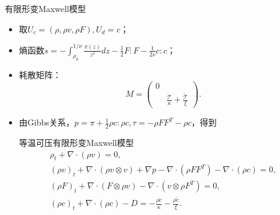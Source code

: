 \documentclass[mathserif]{beamer}
\begin{document}
\begin{frame}{有限形变Maxwell模型}
	\begin{itemize}
		\item<2-> 取$U_c=(\rho, \rho v ,\rho F),U_d = c$；
		\item<3-> 熵函数$ s = -\int_{\rho_0}^{1/\nu} \frac{\pi(z)}{z^2} dz - \frac{1}{2}F:F  - \frac{1}{2\nu }c:c $；
		\item<4-> 耗散矩阵：\begin{equation*}
	M = \left( \begin{matrix}
		0 & \\  & \frac{\dot{\mathcal{T}}}{\kappa} + \frac{\mathring{\mathcal{T}}}{\xi}
	\end{matrix} \right).
	\end{equation*}
	\item<5-> 由Gibbs关系，$p = \pi + \frac{1}{2} \rho c:\rho c,\tau=-\rho FF^T - \rho c$，得到
	\begin{block}{等温可压有限形变Maxwell模型}
	\begin{subequations}%
  \begin{align*}
  \rho_t + \nabla \cdot (\rho v) = 0, \\
  (\rho v)_t + \nabla \cdot ( \rho v \otimes v) + \nabla p- \nabla \cdot (\rho F F^T) - \nabla \cdot (\rho c) = 0, \\
    (\rho F)_t + \nabla \cdot (F \otimes \rho v) - \nabla \cdot (v \otimes \rho F^T) = 0, \\
  (\rho c)_t + \nabla \cdot (\rho c) - D  = -\frac{ \rho \dot{c}}{\kappa}  -\frac{ \rho \mathring{c}}{\xi}.
\end{align*}
\end{subequations}
\end{block}
	\end{itemize}
\end{frame}
\end{document}
